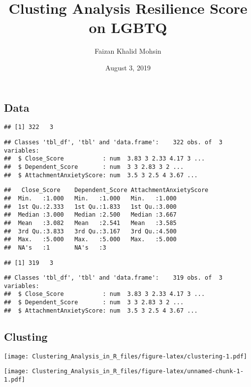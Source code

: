 \documentclass[]{article}
\title{Clusting Analysis Resilience Score on LGBTQ}
\author{Faizan Khalid Mohsin}
\date{August 3, 2019}
\begin{document}
\maketitle

\newpage

\subsection{Data}\label{data}

\begin{verbatim}
## [1] 322   3
\end{verbatim}

\begin{verbatim}
## Classes 'tbl_df', 'tbl' and 'data.frame':    322 obs. of  3 variables:
##  $ Close_Score           : num  3.83 3 2.33 4.17 3 ...
##  $ Dependent_Score       : num  3 3 2.83 3 2 ...
##  $ AttachmentAnxietyScore: num  3.5 3 2.5 4 3.67 ...
\end{verbatim}

\begin{verbatim}
##   Close_Score    Dependent_Score AttachmentAnxietyScore
##  Min.   :1.000   Min.   :1.000   Min.   :1.000         
##  1st Qu.:2.333   1st Qu.:1.833   1st Qu.:3.000         
##  Median :3.000   Median :2.500   Median :3.667         
##  Mean   :3.082   Mean   :2.541   Mean   :3.585         
##  3rd Qu.:3.833   3rd Qu.:3.167   3rd Qu.:4.500         
##  Max.   :5.000   Max.   :5.000   Max.   :5.000         
##  NA's   :1       NA's   :3
\end{verbatim}

\begin{verbatim}
## [1] 319   3
\end{verbatim}

\begin{verbatim}
## Classes 'tbl_df', 'tbl' and 'data.frame':    319 obs. of  3 variables:
##  $ Close_Score           : num  3.83 3 2.33 4.17 3 ...
##  $ Dependent_Score       : num  3 3 2.83 3 2 ...
##  $ AttachmentAnxietyScore: num  3.5 3 2.5 4 3.67 ...
\end{verbatim}

\subsection{Clusting}\label{clusting}

\texttt{[image: Clustering\_Analysis\_in\_R\_files/figure-latex/clustering-1.pdf]}

\texttt{[image: Clustering\_Analysis\_in\_R\_files/figure-latex/unnamed-chunk-1-1.pdf]}
\end{document}
